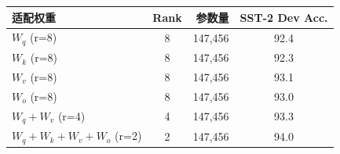 \begin{tabular}{l c r c}
\toprule
适配权重 & Rank & 参数量 & SST-2 Dev Acc. \\
\midrule
$W_q$ (r=8) & 8 & 147,456 & 92.4 \\
$W_k$ (r=8) & 8 & 147,456 & 92.3 \\
$W_v$ (r=8) & 8 & 147,456 & 93.1 \\
$W_o$ (r=8) & 8 & 147,456 & 93.0 \\
$W_q{+}W_v$ (r=4) & 4 & 147,456 & 93.3 \\
$W_q{+}W_k{+}W_v{+}W_o$ (r=2) & 2 & 147,456 & 94.0 \\
\bottomrule
\end{tabular}
